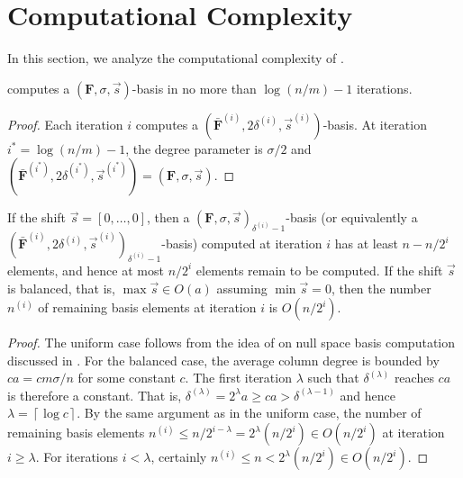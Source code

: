 
\section{Computational Complexity}

\label{sec:complexity}

In this section, we analyze the computational complexity of .
\begin{lem}
 computes a $\left(\mathbf{F},\sigma,\vec{s}\right)$-basis
in no more than $\log\left(n/m\right)-1$ iterations.\end{lem}
\begin{proof}
Each iteration $i$ computes a $(\bar{\mathbf{F}}^{\left(i\right)},2\delta^{\left(i\right)},\vec{s}^{\left(i\right)})$-basis.
At iteration ${i}^{*}=\log(n/m)-1$, the degree parameter is $\sigma/2$
and $(\bar{\mathbf{F}}^{\left({i}^{*}\right)},2\delta^{\left({i}^{*}\right)},\vec{s}^{\left({i}^{*}\right)})=\left(\mathbf{F},\sigma,\vec{s}\right)$.\end{proof}
\begin{lem}
\label{lem:remainingNumberElements}If the shift $\vec{s}=\left[0,\dots,0\right]$,
then a $\left(\mathbf{F},\sigma,\vec{s}\right)_{\delta^{\left(i\right)}-1}$-basis
(or equivalently a $(\bar{\mathbf{F}}^{\left(i\right)},2\delta^{\left(i\right)},\vec{s}^{\left(i\right)})_{\delta^{\left(i\right)}-1}$-basis)
computed at iteration $i$ has at least $n-n/2^{i}$ elements, and
hence at most $n/2^{i}$ elements remain to be computed. If the shift
$\vec{s}$ is balanced, that is, $\max\vec{s}\in O(a)$ assuming $\min\vec{s}=0$,
then the number $n^{\left(i\right)}$ of remaining basis elements
at iteration $i$ is $O(n/2^{i})$.\end{lem}
\begin{proof}
The uniform case follows from the idea of \citet{storjohann-villard:2005}
on null space basis computation discussed in .
For the balanced case, the average column degree is bounded by $ca=cm\sigma/n$
for some constant $c$. The first iteration $\lambda$ such that $\delta^{\left(\lambda\right)}$
reaches $ca$ is therefore a constant. That is, $\delta^{\left(\lambda\right)}=2^{\lambda}a\ge ca>\delta^{\left(\lambda-1\right)}$
and hence $\lambda=\left\lceil \log c\right\rceil $. By the same
argument as in the uniform case, the number of remaining basis elements
$n^{\left(i\right)}\le n/2^{i-\lambda}=2^{\lambda}(n/2^{i})\in O(n/2^{i})$
at iteration $i\ge\lambda$. For iterations $i<\lambda$, certainly
$n^{\left(i\right)}\le n<2^{\lambda}(n/2^{i})\in O(n/2^{i})$.\end{proof}
